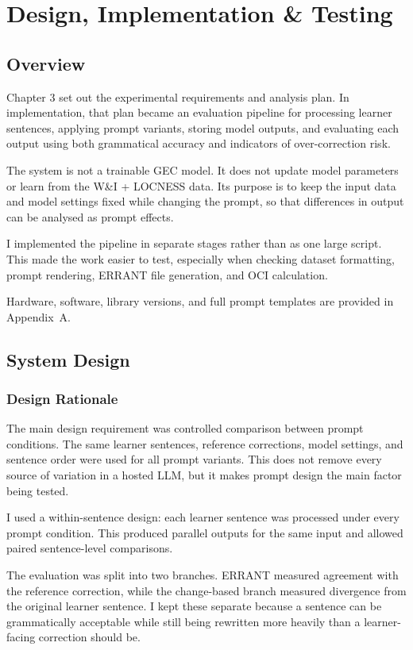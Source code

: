 \chapter{Design, Implementation \& Testing}

\section{Overview}

Chapter 3 set out the experimental requirements and analysis plan. In implementation, that plan became an evaluation pipeline for processing learner sentences, applying prompt variants, storing model outputs, and evaluating each output using both grammatical accuracy and indicators of over-correction risk.

The system is not a trainable GEC model. It does not update model parameters or learn from the W\&I + LOCNESS data. Its purpose is to keep the input data and model settings fixed while changing the prompt, so that differences in output can be analysed as prompt effects.

I implemented the pipeline in separate stages rather than as one large script. This made the work easier to test, especially when checking dataset formatting, prompt rendering, ERRANT file generation, and OCI calculation.

Hardware, software, library versions, and full prompt templates are provided in Appendix~A.

\section{System Design}

\subsection{Design Rationale}

The main design requirement was controlled comparison between prompt conditions. The same learner sentences, reference corrections, model settings, and sentence order were used for all prompt variants. This does not remove every source of variation in a hosted LLM, but it makes prompt design the main factor being tested.

I used a within-sentence design: each learner sentence was processed under every prompt condition. This produced parallel outputs for the same input and allowed paired sentence-level comparisons.

The evaluation was split into two branches. ERRANT measured agreement with the reference correction, while the change-based branch measured divergence from the original learner sentence. I kept these separate because a sentence can be grammatically acceptable while still being rewritten more heavily than a learner-facing correction should be.

